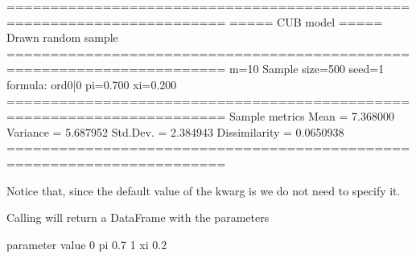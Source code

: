 \documentclass[letterpaper,10pt,english]{sphinxmanual}
\begin{document}
\begin{sphinxVerbatim}[commandchars=\\\{\}]
=======================================================================
=====\PYGZgt{}\PYGZgt{}\PYGZgt{} CUB model \PYGZlt{}\PYGZlt{}\PYGZlt{}===== Drawn random sample
=======================================================================
m=10  Sample size=500  seed=1
formula: ord\PYGZti{}0|0
\PYGZhy{}\PYGZhy{}\PYGZhy{}\PYGZhy{}\PYGZhy{}\PYGZhy{}\PYGZhy{}\PYGZhy{}\PYGZhy{}\PYGZhy{}\PYGZhy{}\PYGZhy{}\PYGZhy{}\PYGZhy{}\PYGZhy{}\PYGZhy{}\PYGZhy{}\PYGZhy{}\PYGZhy{}\PYGZhy{}\PYGZhy{}\PYGZhy{}\PYGZhy{}\PYGZhy{}\PYGZhy{}\PYGZhy{}\PYGZhy{}\PYGZhy{}\PYGZhy{}\PYGZhy{}\PYGZhy{}\PYGZhy{}\PYGZhy{}\PYGZhy{}\PYGZhy{}\PYGZhy{}\PYGZhy{}\PYGZhy{}\PYGZhy{}\PYGZhy{}\PYGZhy{}\PYGZhy{}\PYGZhy{}\PYGZhy{}\PYGZhy{}\PYGZhy{}\PYGZhy{}\PYGZhy{}\PYGZhy{}\PYGZhy{}\PYGZhy{}\PYGZhy{}\PYGZhy{}\PYGZhy{}\PYGZhy{}\PYGZhy{}\PYGZhy{}\PYGZhy{}\PYGZhy{}\PYGZhy{}\PYGZhy{}\PYGZhy{}\PYGZhy{}\PYGZhy{}\PYGZhy{}\PYGZhy{}\PYGZhy{}\PYGZhy{}\PYGZhy{}\PYGZhy{}\PYGZhy{}
pi=0.700
xi=0.200
=======================================================================
Sample metrics
Mean     = 7.368000
Variance = 5.687952
Std.Dev. = 2.384943
\PYGZhy{}\PYGZhy{}\PYGZhy{}\PYGZhy{}\PYGZhy{}\PYGZhy{}\PYGZhy{}\PYGZhy{}\PYGZhy{}\PYGZhy{}\PYGZhy{}\PYGZhy{}\PYGZhy{}\PYGZhy{}\PYGZhy{}\PYGZhy{}\PYGZhy{}\PYGZhy{}\PYGZhy{}\PYGZhy{}\PYGZhy{}\PYGZhy{}\PYGZhy{}\PYGZhy{}\PYGZhy{}\PYGZhy{}\PYGZhy{}\PYGZhy{}\PYGZhy{}\PYGZhy{}\PYGZhy{}\PYGZhy{}\PYGZhy{}\PYGZhy{}\PYGZhy{}\PYGZhy{}\PYGZhy{}\PYGZhy{}\PYGZhy{}\PYGZhy{}\PYGZhy{}\PYGZhy{}\PYGZhy{}\PYGZhy{}\PYGZhy{}\PYGZhy{}\PYGZhy{}\PYGZhy{}\PYGZhy{}\PYGZhy{}\PYGZhy{}\PYGZhy{}\PYGZhy{}\PYGZhy{}\PYGZhy{}\PYGZhy{}\PYGZhy{}\PYGZhy{}\PYGZhy{}\PYGZhy{}\PYGZhy{}\PYGZhy{}\PYGZhy{}\PYGZhy{}\PYGZhy{}\PYGZhy{}\PYGZhy{}\PYGZhy{}\PYGZhy{}\PYGZhy{}\PYGZhy{}
Dissimilarity = 0.0650938
=======================================================================
\end{sphinxVerbatim}

\noindent{}

\sphinxAtStartPar
Notice that, since the default value of the kwarg  is
 we do not need to specify it.

\sphinxAtStartPar
Calling  will return a DataFrame with
the parameters

\begin{sphinxVerbatim}[commandchars=\\\{\}]
  parameter  value
0        pi    0.7
1        xi    0.2
\end{sphinxVerbatim}
\end{document}
